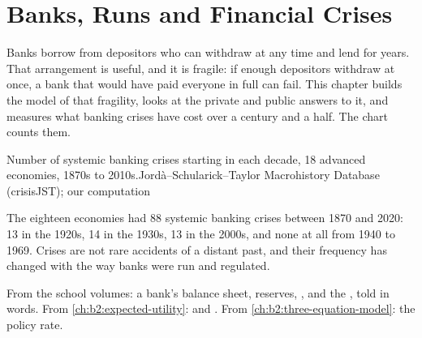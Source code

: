 \chapter{Banks, Runs and Financial Crises}\label{ch:b2:banks-and-crises}

Banks borrow from depositors who can withdraw at any time and lend for years. That arrangement is useful, and it is
fragile: if enough depositors withdraw at once, a bank that would have paid everyone in full can fail. This chapter builds
the model of that fragility, looks at the private and public answers to it, and measures what banking crises have cost
over a century and a half. The chart counts them.

\begin{openingchart}{Number of systemic banking crises starting in each decade, 18 advanced economies, 1870s to
  2010s.}{Jord\`a--Schularick--Taylor Macrohistory Database (crisisJST); our computation}
\end{openingchart}

The eighteen economies had 88 systemic banking crises between 1870 and 2020: 13 in the 1920s, 14 in the 1930s, 13 in
the 2000s, and none at all from 1940 to 1969. Crises are not rare accidents of a distant past, and their frequency has
changed with the way banks were run and regulated.

\begin{recall}
From the school volumes: a bank's balance sheet, reserves, ,  and the , told
in words. From \cref{ch:b2:expected-utility}:  and . From
\cref{ch:b2:three-equation-model}: the policy rate.
\end{recall}

